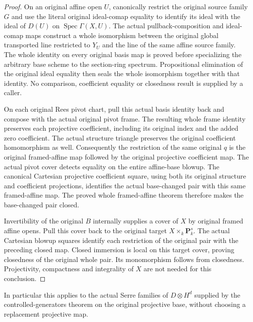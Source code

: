 \begin{proof}
On an original affine open $U$, canonically restrict the original source
family $G$ and use the literal original ideal-comap equality to identify
its ideal with the ideal of $D(U)$ on $\operatorname{Spec}\Gamma(X,U)$.
The actual pullback-composition and ideal-comap maps construct a whole
isomorphism between the original global transported line restricted to
$Y_U$ and the line of the same affine source family.  The whole identity
on every original basis map is proved before specializing the arbitrary
base scheme to the section-ring spectrum.  Propositional elimination of
the original ideal equality then seals the whole isomorphism together
with that identity.  No comparison, coefficient equality or closedness
result is supplied by a caller.

On each original Rees pivot chart, pull this actual basis identity back
and compose with the actual original pivot frame.  The resulting whole
frame identity preserves each projective coefficient, including its
original index and the added zero coefficient.  The actual structure
triangle preserves the original coefficient homomorphism as well.
Consequently the restriction of the same original $q$ is the original
framed-affine map followed by the original projective coefficient map.
The actual pivot cover detects equality on the entire affine-base
blowup.  The canonical Cartesian projective coefficient square, using
both its original structure and coefficient projections, identifies the
actual base-changed pair with this same framed-affine map.  The proved
whole framed-affine theorem therefore makes the base-changed pair closed.

Invertibility of the original $B$ internally supplies a cover of $X$ by
original framed affine opens.  Pull this cover back to the original
target $X\times_k\mathbf P_k^s$.  The actual Cartesian blowup squares
identify each restriction of the original pair with the preceding
closed map.  Closed immersion is local on this target cover, proving
closedness of the original whole pair.  Its monomorphism follows from
closedness.  Projectivity, compactness and integrality of $X$ are not
needed for this conclusion.
\end{proof}

In particular this applies to the actual Serre families of
$D\otimes H^d$ supplied by the controlled-generators theorem on the
original projective base, without choosing a replacement projective map.

